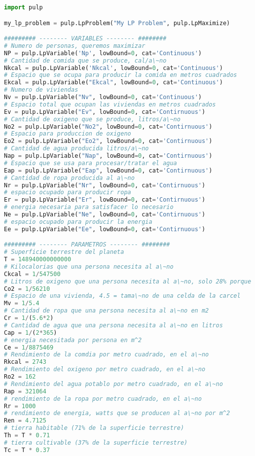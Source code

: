 \documentclass[12pt]{report}
\begin{document}
\begin{lstlisting}[language=Python, frame=single, basicstyle=\tiny]
import pulp

my_lp_problem = pulp.LpProblem("My LP Problem", pulp.LpMaximize)

######### -------- VARIABLES -------- ########
# Numero de personas, queremos maximizar
NP = pulp.LpVariable('Np', lowBound=0, cat='Continuous')
# Cantidad de comida que se produce, cal/a\~no
Nkcal = pulp.LpVariable('Nkcal', lowBound=0, cat='Continuous')
# Espacio que se ocupa para producir la comida en metros cuadrados
Ekcal = pulp.LpVariable("Ekcal", lowBound=0, cat='Continuous')
# Numero de viviendas
Nv = pulp.LpVariable("Nv", lowBound=0, cat='Continuous')
# Espacio total que ocupan las viviendas en metros cuadrados
Ev = pulp.LpVariable("Ev", lowBound=0, cat='Contirnuous')
# Cantidad de oxigeno que se produce, litros/a\~no
No2 = pulp.LpVariable("No2", lowBound=0, cat='Contirnuous')
# Espacio para produccion de oxigeno
Eo2 = pulp.LpVariable("Eo2", lowBound=0, cat='Contirnuous')
# Cantidad de agua producida litros/a\~no
Nap = pulp.LpVariable("Nap", lowBound=0, cat='Contirnuous')
# Espacio que se usa para procesar/tratar el agua
Eap = pulp.LpVariable("Eap", lowBound=0, cat='Contirnuous')
# Cantidad de ropa producida al a\~no
Nr = pulp.LpVariable("Nr", lowBound=0, cat='Contirnuous')
# espacio ocupado para producir ropa
Er = pulp.LpVariable("Er", lowBound=0, cat='Contirnuous')
# energia necesaria para satisfacer lo necesario
Ne = pulp.LpVariable("Ne", lowBound=0, cat='Contirnuous')
# espacio ocupado para producir la energia
Ee = pulp.LpVariable("Ee", lowBound=0, cat='Contirnuous')

######### -------- PARAMETROS -------- ########
# Superficie terrestre del planeta
T = 148940000000000
# Kilocalorias que una persona necesita al a\~no
Ckcal = 1/547500
# Litros de oxigeno que una persona necesita al a\~no, solo 28% porque el otro 72 viene de algas marinas
Co2 = 1/56210
# Espacio de una vivienda, 4.5 = tama\~no de una celda de la carcel
Mv = 1/5.4
# Cantidad de ropa que una persona necesita al a\~no en m2
Cr = 1/(5.6*2)
# Cantidad de agua que una persona necesita al a\~no en litros
Cap = 1/(2*365)
# energia necesitada por persona en m^2
Ce = 1/8875469
# Rendimiento de la comdia por metro cuadrado, en el a\~no 
Rkcal = 2743
# Rendimiento del oxigeno por metro cuadrado, en el a\~no
Ro2 = 162
# Rendimiento del agua potablo por metro cuadrado, en el a\~no
Rap = 321064
# rendimiento de la ropa por metro cuadrado, en el a\~no
Rr = 1000
# rendimiento de energia, watts que se producen al a\~no por m^2
Ren = 4.7125
# tierra habitable (71% de la superficie terrestre)
Th = T * 0.71
# tierra cultivable (37% de la superficie terrestre)
Tc = T * 0.37


\end{lstlisting}
\end{document}
